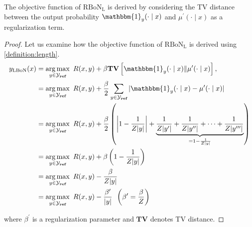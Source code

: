 \begin{proposition}
The objective function of $\mathrm{RBoN}_{\mathrm{L}}$ is derived by considering the TV distance between the output probability $\mathbbm{1}_y (\cdot \mid x)$ and $\mu^\prime(\cdot \mid x)$ as a regularization term.
\end{proposition}
\begin{proof}
Let us examine how the objective function of $\mathrm{RBoN}_{\mathrm{L}}$ is derived using \cref{definition:length}.
\begin{equation*}
\begin{aligned}
y_{\mathrm{LBoN}}(x) &=\argmax_{y \in \mathcal{Y_{\textbf{ref}}}}\,\,  R(x, y)+\beta \textbf{TV}\left[\mathbbm{1}_y (\cdot \mid x) \| \mu^\prime(\cdot \mid x)\right],\\
&= \argmax_{y \in \mathcal{Y_{\textbf{ref}}}}  \,\,R(x, y)+\frac{\beta}{2} \sum_{y \in \mathcal{Y_{\textbf{ref}}}} |\mathbbm{1}_y (\cdot \mid x) - \mu^\prime(\cdot \mid x)|\\
&= \argmax_{y \in \mathcal{Y_{\textbf{ref}}}}\,\,  R(x, y)+\frac{\beta}{2}\left( \left|1 - \frac{1}{Z|y|}\right| + \underbrace{\frac{1}{Z|y^\prime|} + \frac{1}{Z|y^{\prime\prime}|} + \cdots + \frac{1}{Z|y^{\prime\prime\prime}|}}_{= 1 - \frac{1}{Z|y|}} \right)\\
&= \argmax_{y \in \mathcal{Y_{\textbf{ref}}}} \,\, R(x, y)+\beta\left(1 - \frac{1}{Z|y|}\right)\\
&= \argmax_{y \in \mathcal{Y_{\textbf{ref}}}} \,\, R(x, y)-\frac{\beta}{Z|y|} \\
&= \argmax_{y \in \mathcal{Y_{\textbf{ref}}}} \,\, R(x, y)-\frac{\beta^\prime}{|y|} \, \, \, \left(\textbf{$\beta^\prime = \frac{\beta}{Z}$}\right)\\
\end{aligned}
\end{equation*}

where $\beta^\prime$ is a regularization parameter and $\textbf{TV}$ denotes TV distance. 
\end{proof}
